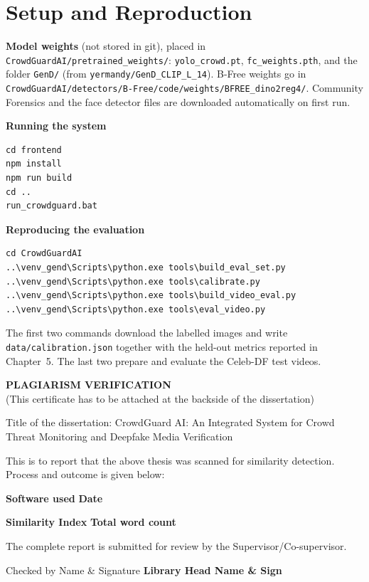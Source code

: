 \documentclass[12pt,a4paper,oneside]{report}
\begin{document}
\chapter{Setup and Reproduction}
\textbf{Model weights} (not stored in git), placed in \texttt{CrowdGuardAI/pretrained\_weights/}: \texttt{yolo\_crowd.pt}, \texttt{fc\_weights.pth}, and the folder \texttt{GenD/} (from \texttt{yermandy/GenD\_CLIP\_L\_14}). B-Free weights go in \texttt{CrowdGuardAI/detectors/B-Free/code/weights/BFREE\_dino2reg4/}. Community Forensics and the face detector files are downloaded automatically on first run.

\textbf{Running the system}
\begin{verbatim}
cd frontend
npm install
npm run build
cd ..
run_crowdguard.bat
\end{verbatim}

\textbf{Reproducing the evaluation}
\begin{verbatim}
cd CrowdGuardAI
..\venv_gend\Scripts\python.exe tools\build_eval_set.py
..\venv_gend\Scripts\python.exe tools\calibrate.py
..\venv_gend\Scripts\python.exe tools\build_video_eval.py
..\venv_gend\Scripts\python.exe tools\eval_video.py
\end{verbatim}

The first two commands download the labelled images and write \texttt{data/calibration.json} together with the held-out metrics reported in Chapter~5. The last two prepare and evaluate the Celeb-DF test videos.

\clearpage
\begin{center}\textbf{PLAGIARISM VERIFICATION}\\(This certificate has to be attached at the backside of the dissertation)\end{center}

Title of the dissertation: CrowdGuard AI: An Integrated System for Crowd Threat Monitoring and Deepfake Media Verification

This is to report that the above thesis was scanned for similarity detection. Process and outcome is given below:

\textbf{Software used} \dotfill \textbf{Date} \dotfill

\textbf{Similarity Index} \dotfill \textbf{Total word count} \dotfill

The complete report is submitted for review by the Supervisor/Co-supervisor.

\vspace{1cm}
Checked by Name \& Signature \hfill \textbf{Library Head Name \& Sign}
\end{document}
